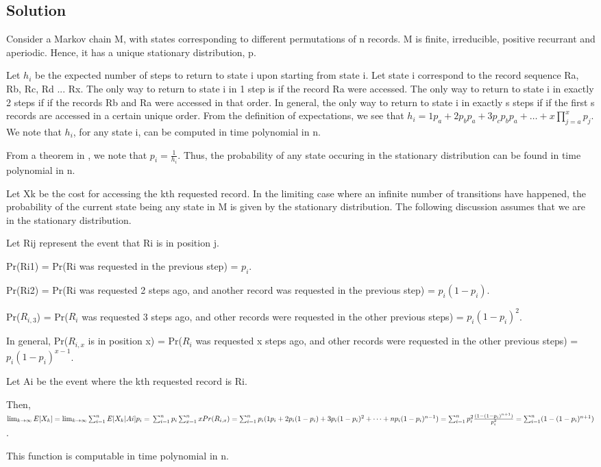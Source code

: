 \documentclass[10pt]{amsart}
\theoremstyle{remark}
\begin{document}
\subsection{Solution}

Consider a Markov chain M, with states corresponding to different permutations of n records. M is finite, irreducible, positive recurrant and aperiodic. Hence, it has a unique stationary distribution, p.

Let $h_{i}$ be the expected number of steps to return to state i upon starting from state i. Let state i correspond to the record sequence Ra, Rb, Rc, Rd ... Rx. The only way to return to state i in 1 step is if the record Ra were accessed. The only way to return to state i in exactly 2 steps if if the records Rb and Ra were accessed in that order. In general, the only way to return to state i in exactly s steps if if the first s records are accessed in a certain unique order. From the definition of expectations, we see that $h_{i}=1p_{a}+2p_{b}p_{a}+3p_{c}p_{b}p_{a} + \dots + x\prod_{j=a}^{x}p_{j}$. We note that $h_{i}$, for any state i, can be computed in time polynomial in n.

From a theorem in \cite{mitzenmacherUpfal}, we note that $p_{i}=\frac{1}{h_{i}}$. Thus, the probability of any state occuring in the stationary distribution can be found in time polynomial in n.

Let Xk be the cost for accessing the kth requested record. In the limiting case where an infinite number of transitions have happened, the probability of the current state being any state in M is given by the stationary distribution. The following discussion assumes that we are in the stationary distribution.

Let Rij represent the event that Ri is in position j.

Pr(Ri1) = Pr(Ri was requested in the previous step) = $p_{i}$.

Pr(Ri2) = Pr(Ri was requested 2 steps ago, and another record was requested in the previous step) = $p_{i}(1-p_{i})$.

Pr($R_{i,3}$) = Pr($R_{i}$ was requested 3 steps ago, and other records were requested in the other previous steps) = $p_{i}(1-p_{i})^{2}$.

In general, Pr($R_{i,x}$ is in position x) = Pr($R_{i}$ was requested x steps ago, and other records were requested in the other previous steps) = $p_{i}(1-p_{i})^{x-1}$.

Let Ai be the event where the kth requested record is Ri.

Then, $\lim_{k \to \infty} E[X_{k}] = \lim_{k \to \infty} \sum_{i=1}^{n} E[X_{k}|Ai]p_{i} = \\
\sum_{i=1}^{n} p_{i}\sum_{x=1}^{n} xPr(R_{i,x}) = \sum_{i=1}^{n} p_{i}(1p_{i}+2p_{i}(1-p_{i})+3p_{i}(1-p_{i})^{2}+\dots + np_{i}(1-p_{i})^{n-1}) = \sum_{i=1}^{n} p_{i}^{2}\frac{(1-(1-p_{i})^{n+1})}{p_{i}^{2}} = \sum_{i=1}^{n} (1-(1-p_{i})^{n+1})$.

This function is computable in time polynomial in n.



\end{document}
